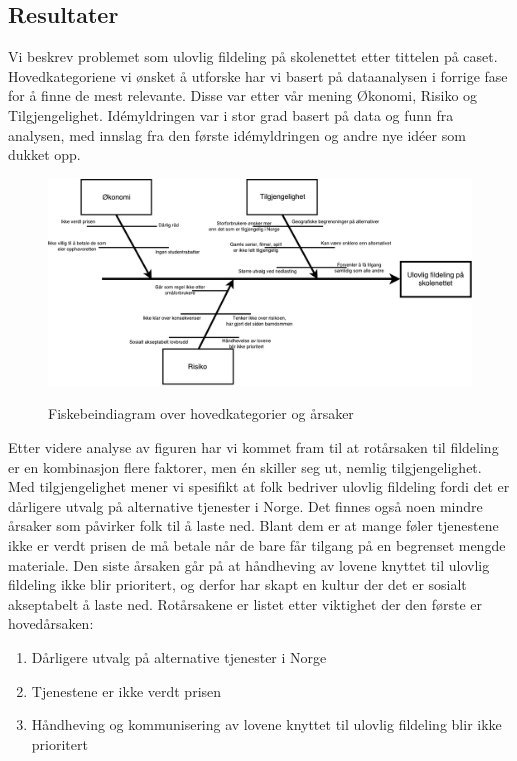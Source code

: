 \subsection{Resultater}
Vi beskrev problemet som ulovlig fildeling på skolenettet etter tittelen på caset. Hovedkategoriene vi ønsket å utforske har vi basert på dataanalysen i forrige fase for å finne de mest relevante. Disse var etter vår mening Økonomi, Risiko og Tilgjengelighet. Idémyldringen var i stor grad basert på data og funn fra analysen, med innslag fra den første idémyldringen og andre nye idéer som dukket opp.

\begin{figure}[H]
    \centering
    \includegraphics[scale=0.5]{case_1/bilder/fiskebein.pdf}
    \label{fig:fiskebein}
    \caption[Fiskebein]{Fiskebeindiagram over hovedkategorier og årsaker}
\end{figure}

Etter videre analyse av figuren har vi kommet fram til at rotårsaken til fildeling er en kombinasjon flere faktorer, men én skiller seg ut, nemlig tilgjengelighet. Med tilgjengelighet mener vi spesifikt at folk bedriver ulovlig fildeling fordi det er dårligere utvalg på alternative tjenester i Norge. Det finnes også noen mindre årsaker som påvirker folk til å laste ned. Blant dem er at mange føler tjenestene ikke er verdt prisen de må betale når de bare får tilgang på en begrenset mengde materiale. Den siste årsaken går på at håndheving av lovene knyttet til ulovlig fildeling ikke blir prioritert, og derfor har skapt en kultur der det er sosialt akseptabelt å laste ned. Rotårsakene er listet etter viktighet der den første er hovedårsaken:

\begin{enumerate}
    \item Dårligere utvalg på alternative tjenester i Norge
    \item Tjenestene er ikke verdt prisen
    \item Håndheving og kommunisering av lovene knyttet til ulovlig fildeling blir ikke prioritert
\end{enumerate}

